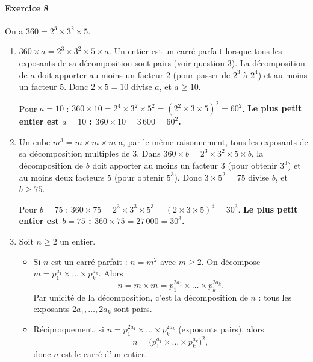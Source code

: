 \documentclass[11pt,a4paper]{article}
\newcommand{\exo}[1]{\paragraph{Exercice #1}}
\newcommand{\rep}[1]{\textbf{#1}}
\begin{document}
\exo{8}
On a $360 = 2^3 \times 3^2 \times 5$.
\begin{enumerate}[label=\rep{\arabic*.}]
  \item $360 \times a = 2^3 \times 3^2 \times 5 \times a$. Un entier est un carré parfait lorsque tous les exposants de sa décomposition sont pairs (voir question 3). La décomposition de $a$ doit apporter au moins un facteur $2$ (pour passer de $2^3$ à $2^4$) et au moins un facteur $5$. Donc $2 \times 5 = 10$ divise $a$, et $a \geq 10$.

  Pour $a = 10$ : $360 \times 10 = 2^4 \times 3^2 \times 5^2 = (2^2 \times 3 \times 5)^2 = 60^2$.
  \rep{Le plus petit entier est $a = 10$ : $360 \times 10 = 3\,600 = 60^2$.}

  \item Un cube $m^3 = m \times m \times m$ a, par le même raisonnement, tous les exposants de sa décomposition multiples de $3$. Dans $360 \times b = 2^3 \times 3^2 \times 5 \times b$, la décomposition de $b$ doit apporter au moins un facteur $3$ (pour obtenir $3^3$) et au moins deux facteurs $5$ (pour obtenir $5^3$). Donc $3 \times 5^2 = 75$ divise $b$, et $b \geq 75$.

  Pour $b = 75$ : $360 \times 75 = 2^3 \times 3^3 \times 5^3 = (2 \times 3 \times 5)^3 = 30^3$.
  \rep{Le plus petit entier est $b = 75$ : $360 \times 75 = 27\,000 = 30^3$.}
  \item Soit $n \geq 2$ un entier.
  \begin{itemize}
    \item Si $n$ est un carré parfait : $n = m^2$ avec $m \geq 2$. On décompose $m = p_1^{a_1} \times \dots \times p_k^{a_k}$. Alors
    \[ n = m \times m = p_1^{2a_1} \times \dots \times p_k^{2a_k}. \]
    Par unicité de la décomposition, c'est la décomposition de $n$ : tous les exposants $2a_1, \dots, 2a_k$ sont pairs.
    \item Réciproquement, si $n = p_1^{2a_1} \times \dots \times p_k^{2a_k}$ (exposants pairs), alors
    \[ n = \big(p_1^{a_1} \times \dots \times p_k^{a_k}\big)^2, \]
    donc $n$ est le carré d'un entier.
  \end{itemize}
\end{enumerate}
\end{document}
